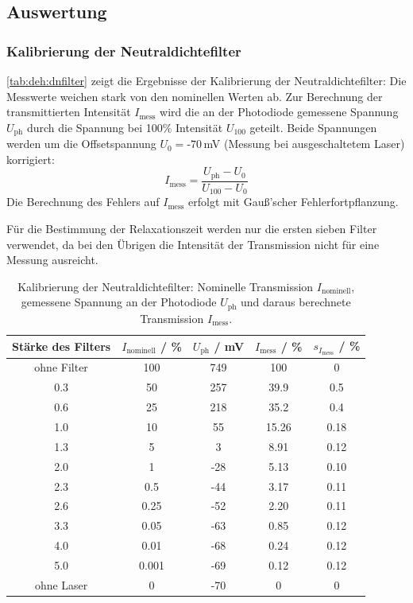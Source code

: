 \subsection{Auswertung}

\subsubsection*{Kalibrierung der Neutraldichtefilter}

\autoref{tab:deh:dnfilter} zeigt die Ergebnisse der Kalibrierung der Neutraldichtefilter:
Die Messwerte weichen stark von den nominellen Werten ab.
Zur Berechnung der transmittierten Intensität $I_\text{mess}$ wird
die an der Photodiode gemessene Spannung $U_{\text{ph}}$
durch die Spannung bei 100\% Intensität $U_{100}$ geteilt.
Beide Spannungen werden um die Offsetspannung $U_{0}=\text{-}70\,$mV (Messung bei ausgeschaltetem Laser) korrigiert:
\begin{equation}
  I_\text{mess}=\frac{U_{\text{ph}}-U_{0}}{U_{100}-U_{0}}
\end{equation}
Die Berechnung des Fehlers auf $I_\text{mess}$ erfolgt mit Gauß'scher Fehlerfortpflanzung.


Für die Bestimmung der Relaxationszeit werden nur die ersten sieben Filter verwendet,
da bei den Übrigen die Intensität der Transmission nicht für eine Messung ausreicht.
%
\begin{table}[H]
\caption{Kalibrierung der Neutraldichtefilter: Nominelle Transmission $I_{\text{nominell}}$, gemessene Spannung an der Photodiode $U_{\text{ph}}$ und daraus berechnete Transmission $I_{\text{mess}}$. }
\begin{center}
\begin{tabular}{|c|c|c|c|c|}
  \hline
  Stärke des Filters & $I_\text{nominell}$ / \% & $U_\text{ph}$ / mV & $I_\text{mess}$ / \% & $s_{I_\text{mess}}$ / \% \\ \hline
  ohne Filter & 100 & 749 & 100 & 0 \\ \hline
  0.3 & 50 & 257 & 39.9 & 0.5 \\ \hline
  0.6 & 25 & 218 & 35.2 & 0.4 \\ \hline
  1.0 & 10 & 55 & 15.26 & 0.18 \\ \hline
  1.3 & 5 & 3 & 8.91 & 0.12 \\ \hline
  2.0 & 1 & -28 & 5.13 & 0.10 \\ \hline
  2.3 & 0.5 & -44 & 3.17 & 0.11 \\ \hline
  2.6 & 0.25 & -52 & 2.20 & 0.11 \\ \hline
  3.3 & 0.05 & -63 & 0.85 & 0.12 \\ \hline
  4.0 & 0.01 & -68 & 0.24 & 0.12 \\ \hline
  5.0 & 0.001 & -69 & 0.12 & 0.12 \\ \hline
  ohne Laser & 0 & -70 & 0 & 0 \\ \hline
\end{tabular}
\end{center}
\label{tab:deh:dnfilter}
\end{table}

